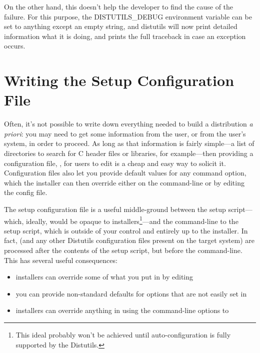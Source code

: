\documentclass{howto}
\begin{document}
On the other hand, this doesn't help the developer to find the cause
of the failure. For this purpose, the DISTUTILS_DEBUG environment
variable can be set to anything except an empty string, and distutils
will now print detailed information what it is doing, and prints the
full traceback in case an exception occurs.

\section{Writing the Setup Configuration File}
\label{setup-config}

Often, it's not possible to write down everything needed to build a
distribution \emph{a priori}: you may need to get some information from
the user, or from the user's system, in order to proceed.  As long as
that information is fairly simple---a list of directories to search for
C header files or libraries, for example---then providing a
configuration file, , for users to edit is a cheap and
easy way to solicit it.  Configuration files also let you provide
default values for any command option, which the installer can then
override either on the command-line or by editing the config file.


The setup configuration file is a useful middle-ground between the setup
script---which, ideally, would be opaque to installers\footnote{This
  ideal probably won't be achieved until auto-configuration is fully
  supported by the Distutils.}---and the command-line to the setup
script, which is outside of your control and entirely up to the
installer.  In fact,  (and any other Distutils
configuration files present on the target system) are processed after
the contents of the setup script, but before the command-line.  This has 
several useful consequences:
\begin{itemize}
\item installers can override some of what you put in  by
  editing 
\item you can provide non-standard defaults for options that are not
  easily set in 
\item installers can override anything in  using the
  command-line options to 
\end{itemize}
\end{document}
